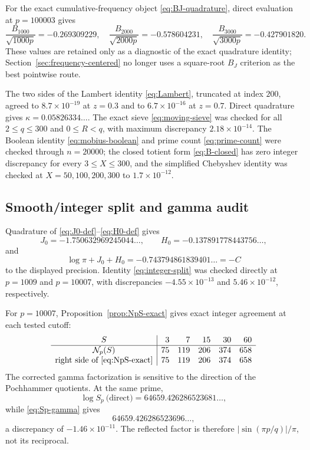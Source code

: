 \documentclass[11pt]{amsart}
\numberwithin{equation}{section}
\theoremstyle{definition}
\theoremstyle{remark}
\begin{document}
For the exact cumulative-frequency object \eqref{eq:BJ-quadrature}, direct
evaluation at \(p=100003\) gives
\[
 \frac{B_{1000}}{\sqrt{1000p}}=-0.269309229,
 \quad
 \frac{B_{2000}}{\sqrt{2000p}}=-0.578604231,
 \quad
 \frac{B_{3000}}{\sqrt{3000p}}=-0.427901820.
\]
These values are retained only as a diagnostic of the exact quadrature
identity; Section~\ref{sec:frequency-centered} no longer uses a square-root
\(B_J\) criterion as the best pointwise route.

The two sides of the Lambert identity \eqref{eq:Lambert}, truncated at
index \(200\), agreed to \(8.7\times10^{-19}\) at \(z=0.3\) and to
\(6.7\times10^{-16}\) at \(z=0.7\).  Direct quadrature gives
\(\kappa=0.05826334\ldots\).  The exact sieve
\eqref{eq:moving-sieve} was checked for all \(2\le q\le300\) and
\(0\le R<q\), with maximum discrepancy \(2.18\times10^{-14}\).  The
Boolean identity \eqref{eq:mobius-boolean} and prime count
\eqref{eq:prime-count} were checked through \(n=20000\); the closed totient
form \eqref{eq:B-closed} has zero integer discrepancy for every
\(3\le X\le300\), and the simplified Chebyshev identity was checked at
\(X=50,100,200,300\) to \(1.7\times10^{-12}\).

\subsection{Smooth/integer split and gamma audit}

Quadrature of \eqref{eq:J0-def}--\eqref{eq:H0-def} gives
\[
 J_0=-1.750632969245044\ldots,
 \qquad H_0=-0.137891778443756\ldots,
\]
and
\[
 \log\pi+J_0+H_0=-0.743794861839401\ldots=-C
\]
to the displayed precision.  Identity \eqref{eq:integer-split} was checked
directly at \(p=1009\) and \(p=10007\), with discrepancies
\(-4.55\times10^{-13}\) and \(5.46\times10^{-12}\), respectively.

For \(p=10007\), Proposition~\ref{prop:NpS-exact} gives exact integer
agreement at each tested cutoff:
\[
\begin{array}{c|rrrrr}
 S&3&7&15&30&60\\ \hline
 \mathcal N_p(S)&75&119&206&374&658\\
 \text{right side of \eqref{eq:NpS-exact}}&75&119&206&374&658
\end{array}
\]
The corrected gamma factorization is sensitive to the direction of the
Pochhammer quotients.  At the same prime,
\[
 \log S_p\ \text{(direct)}=64659.426286523681\ldots,
\]
while \eqref{eq:Sp-gamma} gives
\[
 64659.426286523696\ldots,
\]
a discrepancy of \(-1.46\times10^{-11}\).  The reflected factor is
therefore \(|\sin(\pi p/q)|/\pi\), not its reciprocal.
\end{document}

